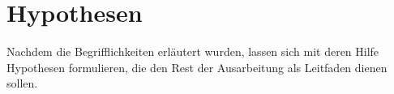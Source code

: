 \section{Hypothesen}
\label{sec:hypothesen}
Nachdem die Begrifflichkeiten erläutert wurden, lassen sich mit deren Hilfe Hypothesen formulieren, die den Rest der Ausarbeitung als Leitfaden dienen sollen.
